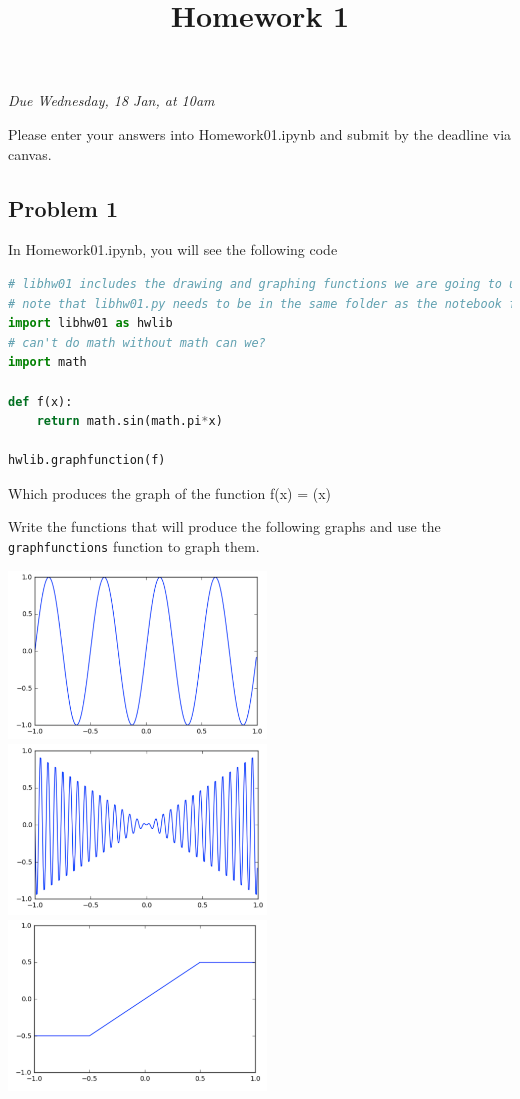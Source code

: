 \documentclass[letterpaper,11pt]{amsart}
\title{Homework 1}
\date{}
\theoremstyle{plain}
\theoremstyle{definition}
\begin{document}
\maketitle
\begin{center}
  \emph{Due Wednesday, 18 Jan, at 10am}
  \vspace{0.3in}
  \end{center}


\noindent Please enter your answers into Homework01.ipynb and submit by the deadline via canvas.

\subsection*{Problem 1} In Homework01.ipynb, you will see the following code

\begin{lstlisting}[language=Python]
# libhw01 includes the drawing and graphing functions we are going to use
# note that libhw01.py needs to be in the same folder as the notebook file you are running
import libhw01 as hwlib
# can't do math without math can we?
import math

def f(x):
    return math.sin(math.pi*x)

hwlib.graphfunction(f)
\end{lstlisting}
Which produces the graph of the function f(x) = \sin(\pi x)

Write the functions that will produce the following graphs and use the {\tt{graphfunctions}} function to graph them.
\vspace{0.1in}

\noindent\includegraphics[width=2.7in]{graph1.png}
\includegraphics[width=2.7in]{graph2.png}\\
\includegraphics[width=2.7in]{graph3.png}
\end{document}
